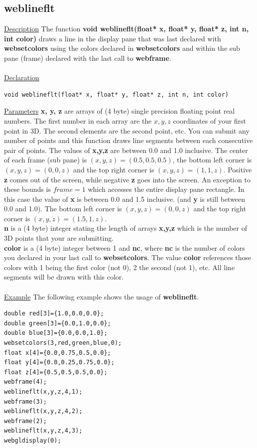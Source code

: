 \subsection{weblineflt}
\label{sec:2-5}
\underline{Description} The function \textbf{void weblineflt(float* x, float* y, float* z, int n, int color)} draws a line in the display pane
that was last declared with \textbf{websetcolors} using the colors declared in \textbf{websetcolors} and within the sub pane (frame)
declared with the last call to \textbf{webframe}.\\
\\
\underline{Declaration}
\begin{verbatim}
void weblineflt(float* x, float* y, float* z, int n, int color)
\end{verbatim}
\underline{Parameters} \textbf{x, y, z} are arrays of (4 byte) single precision floating point real numbers. The first number in each array
are the $x,y,z$ coordinates of your first point in 3D. The second elements are the second point, etc. You can submit any number of points 
and this function draws line segments between each consecutive pair of points. The values of \textbf{x,y,z} are between 0.0 and 1.0 inclusive.
The center of each frame (sub pane) is $(x,y,z)=(0.5,0.5,0.5)$, the bottom left corner is $(x,y,z)=(0,0,z)$ and the top right corner is $(x,y,z)=(1,1,z)$.
Positive \textbf{z} comes out of the screen, while negative \textbf{z} goes into the screen.
An exception to these bounds is $frame = 1$ which accesses the entire display pane rectangle. 
In this case the value of \textbf{x} is between 0.0 and 1.5 inclusive. (and \textbf{y} is still between 0.0 and 1.0). The 
bottom left corner is $(x,y,z)=(0,0,z)$ and the top right corner is $(x,y,z)=(1.5,1,z)$.\\
\textbf{n} is a (4 byte) integer stating the length of arrays \textbf{x,y,z} which is the number of 3D points that your are submitting.\\
\textbf{color} is a (4 byte) integer between 1 and \textbf{nc}, where \textbf{nc} is the number of colors you declared in your last call
to \textbf{websetcolors}. The value \textbf{color} references those colors with 1 being the first color (not 0), 2 the second (not 1), etc. 
All line segments will be drawn with this color.\\
\\
\underline{Example} The following example shows the usage of \textbf{weblineflt}.
\begin{verbatim}
double red[3]={1.0,0.0,0.0};
double green[3]={0.0,1.0,0.0};
double blue[3]={0.0,0.0,1.0};
websetcolors(3,red,green,blue,0);
float x[4]={0.0,0.75,0.5,0.0};
float y[4]={0.0,0.25,0.75,0.0};
float z[4]={0.5,0.5,0.5,0.0};
webframe(4);
weblineflt(x,y,z,4,1);
webframe(3);
weblineflt(x,y,z,4,2);
webframe(2);
weblineflt(x,y,z,4,3);
webgldisplay(0);
\end{verbatim}
